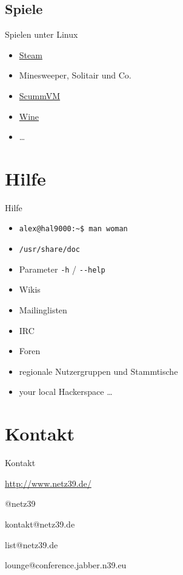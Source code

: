 \documentclass{beamer}
\begin{document}
\subsection{Spiele}

\begin{frame}{Spielen unter Linux}
    \begin{itemize}
        \item \href{https://store.steampowered.com/linux}{Steam}
        \item Minesweeper, Solitair und Co.
        \item \href{https://www.scummvm.org/}{ScummVM}
        \item \href{https://www.winehq.org/}{Wine}
        \item …
    \end{itemize}
\end{frame}

\section{Hilfe}

\frame{\tableofcontents[currentsection]}

\begin{frame}{Hilfe}
    \begin{itemize}
        \item \texttt{alex@hal9000:\textasciitilde\$ man woman}
        \item \texttt{/usr/share/doc}
        \item Parameter \texttt{-h} / \texttt{-{}-help}
        \item Wikis
        \item Mailinglisten
        \item IRC
        \item Foren
        \item regionale Nutzergruppen und Stammtische
        \item your local Hackerspace …
    \end{itemize}
\end{frame}

\section{Kontakt}

\begin{frame}{Kontakt}
    \begin{center}
        \begin{description}
            \item[WWW] \url{http://www.netz39.de/}
            \item[Twitter] @netz39
            \item[E-Mail] kontakt@netz39.de
            \item[Mailingliste] list@netz39.de
            \item[Jabber/XMPP MUC] lounge@conference.jabber.n39.eu
        \end{description}
    \end{center}
\end{frame}
\end{document}
